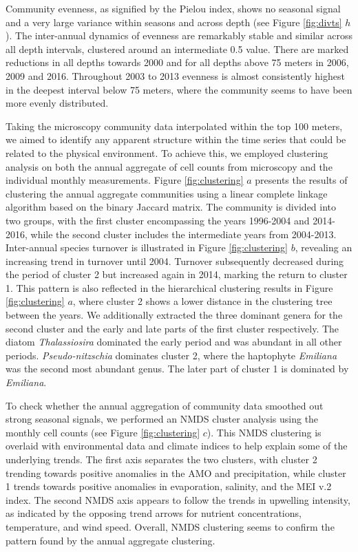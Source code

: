 \documentclass[draft]{agujournal2019}
\begin{document}
Community evenness, as signified by the Pielou index, shows no seasonal signal and a very large variance within seasons and across depth (see Figure \ref{fig:divts} $h$). The inter-annual dynamics of evenness are remarkably stable and similar across all depth intervals, clustered around an intermediate 0.5 value. There are marked reductions in all depths towards 2000 and for all depths above 75 meters in 2006, 2009 and 2016. Throughout 2003 to 2013 evenness is almost consistently highest in the deepest interval below 75 meters, where the community seems to have been more evenly distributed. 


Taking the microscopy community data interpolated within the top 100 meters, we aimed to identify any apparent structure within the time series that could be related to the physical environment. To achieve this, we employed clustering analysis on both the annual aggregate of cell counts from microscopy and the individual monthly measurements. Figure \ref{fig:clustering} $a$ presents the results of clustering the annual aggregate communities using a linear complete linkage algorithm based on the binary Jaccard matrix. The community is divided into two groups, with the first cluster encompassing the years 1996-2004 and 2014-2016, while the second cluster includes the intermediate years from 2004-2013. 
Inter-annual species turnover is illustrated in Figure \ref{fig:clustering} $b$, revealing an increasing trend in turnover until 2004. Turnover subsequently decreased during the period of cluster 2 but increased again in 2014, marking the return to cluster 1. This pattern is also reflected in the hierarchical clustering results in Figure \ref{fig:clustering} $a$, where cluster 2 shows a lower distance in the clustering tree between the years. We additionally extracted the three dominant genera for the second cluster and the early and late parts of the first cluster respectively. The diatom \textit{Thalassiosira} dominated the early period and was abundant in all other periods. \textit{Pseudo-nitzschia} dominates cluster 2, where the haptophyte \textit{Emiliana} was the second most abundant genus. The later part of cluster 1 is dominated by \textit{Emiliana}. 

To check whether the annual aggregation of community data smoothed out strong seasonal signals, we performed an NMDS cluster analysis using the monthly cell counts (see Figure \ref{fig:clustering} $c$). This NMDS clustering is overlaid with environmental data and climate indices to help explain some of the underlying trends. The first axis separates the two clusters, with cluster 2 trending towards positive anomalies in the AMO and precipitation, while cluster 1 trends towards positive anomalies in evaporation, salinity, and the MEI v.2 index. The second NMDS axis appears to follow the trends in upwelling intensity, as indicated by the opposing trend arrows for nutrient concentrations, temperature, and wind speed. Overall, NMDS clustering seems to confirm the pattern found by the annual aggregate clustering. 
\end{document}
